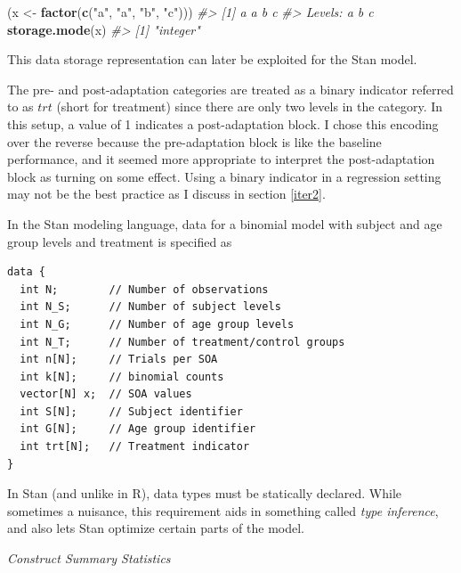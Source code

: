 \documentclass[11pt, oneside, openany]{scrbook}
\newenvironment{Shaded}{\begin{snugshade}}{\end{snugshade}}
\newcommand{\CommentTok}[1]{\textcolor[rgb]{0.56,0.35,0.01}{\textit{#1}}}
\newcommand{\KeywordTok}[1]{\textcolor[rgb]{0.13,0.29,0.53}{\textbf{#1}}}
\newcommand{\NormalTok}[1]{#1}
\newcommand{\StringTok}[1]{\textcolor[rgb]{0.31,0.60,0.02}{#1}}
\begin{document}

\begin{Shaded}
\begin{Highlighting}[]
\NormalTok{(x <-}\StringTok{ }\KeywordTok{factor}\NormalTok{(}\KeywordTok{c}\NormalTok{(}\StringTok{"a"}\NormalTok{, }\StringTok{"a"}\NormalTok{, }\StringTok{"b"}\NormalTok{, }\StringTok{"c"}\NormalTok{)))}
\CommentTok{#> [1] a a b c}
\CommentTok{#> Levels: a b c}
\KeywordTok{storage.mode}\NormalTok{(x)}
\CommentTok{#> [1] "integer"}
\end{Highlighting}
\end{Shaded}


This data storage representation can later be exploited for the Stan model.

The pre- and post-adaptation categories are treated as a binary indicator referred to as \(trt\) (short for treatment) since there are only two levels in the category. In this setup, a value of 1 indicates a post-adaptation block. I chose this encoding over the reverse because the pre-adaptation block is like the baseline performance, and it seemed more appropriate to interpret the post-adaptation block as turning on some effect. Using a binary indicator in a regression setting may not be the best practice as I discuss in section \ref{iter2}.

In the Stan modeling language, data for a binomial model with subject and age group levels and treatment is specified as


\begin{verbatim}
data {
  int N;        // Number of observations
  int N_S;      // Number of subject levels
  int N_G;      // Number of age group levels
  int N_T;      // Number of treatment/control groups
  int n[N];     // Trials per SOA
  int k[N];     // binomial counts
  vector[N] x;  // SOA values
  int S[N];     // Subject identifier
  int G[N];     // Age group identifier
  int trt[N];   // Treatment indicator
}
\end{verbatim}


In Stan (and unlike in R), data types must be statically declared. While sometimes a nuisance, this requirement aids in something called \emph{type inference}, and also lets Stan optimize certain parts of the model.

\emph{Construct Summary Statistics}
\end{document}
